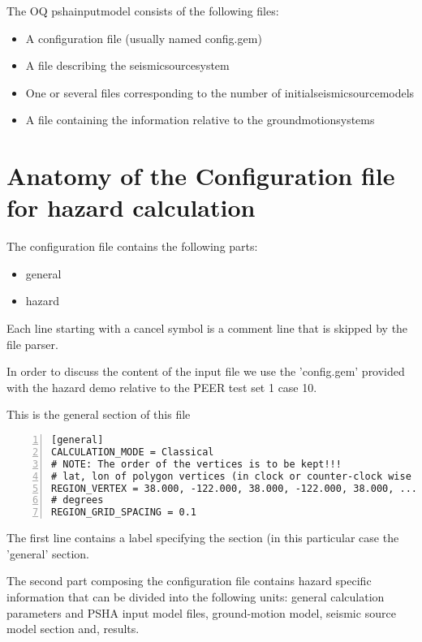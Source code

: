 The OQ \gls{pshainputmodel} consists of the following files:
\begin{itemize}
	\item A configuration file (usually named config.gem)	
	\item A file describing the \gls{seismicsourcesystem}
	\item One or several files corresponding to the number of 
		\glspl{initialseismicsourcemodel}
	\item A file containing the information relative to the 
		\glspl{groundmotionsystem}
\end{itemize}
%
\section{Anatomy of the Configuration file for hazard calculation}
The configuration file contains the following parts:
\begin{itemize}
	\item general 
	\item hazard
\end{itemize}
Each line starting with a cancel symbol is a comment line that is skipped
by the file parser. 

In order to discuss the content of the input file we use the 'config.gem' 
provided with the hazard demo relative to the PEER test set 1 case 10.

This is the general section of this file 
\begin{Verbatim}[baselinestretch=1,fontsize=\small,numbers=left,frame=single]
[general]
CALCULATION_MODE = Classical
# NOTE: The order of the vertices is to be kept!!!
# lat, lon of polygon vertices (in clock or counter-clock wise order)
REGION_VERTEX = 38.000, -122.000, 38.000, -122.000, 38.000, ...
# degrees
REGION_GRID_SPACING = 0.1
\end{Verbatim}
%
The first line contains a label specifying the section (in this 
particular case the 'general' section.

The second part composing the configuration file contains hazard 
specific information that can be divided into the following units: 
general calculation parameters and PSHA input model files, 
ground-motion model, seismic source model section and, results.
%
%
